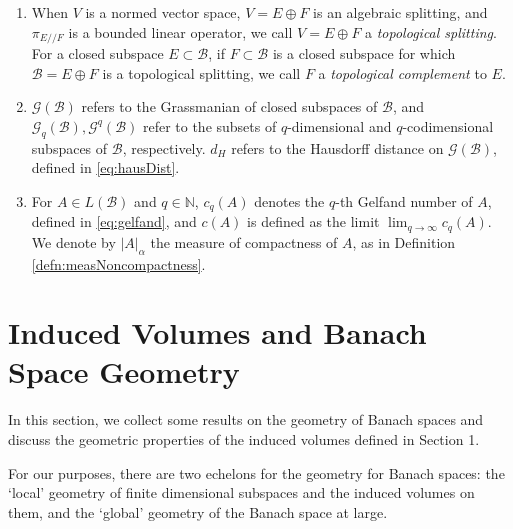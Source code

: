\documentclass[11pt]{amsart}
\theoremstyle{theorem}
\theoremstyle{definition}
\numberwithin{equation}{section}
\newcommand{\N}{\mathbb{N}}
\newcommand{\Gc}{\mathcal{G}}
\renewcommand{\a}{\alpha}
\newcommand{\Bc}{\mathcal{B}}
\newcommand{\ds}{/ \! /}
\begin{document}
\begin{enumerate}
\item When $V$ is a normed vector space, $V = E \oplus F$ is an algebraic splitting, and $\pi_{E \ds F}$ is a bounded linear operator, we call $V = E \oplus F$ a \emph{topological splitting}. For a closed subspace $E \subset \Bc$, if $F \subset \Bc$ is a closed subspace for which $\Bc = E \oplus F$ is a topological splitting, we call $F$ a \emph{topological complement} to $E$.

\item $\Gc(\Bc)$ refers to the Grassmanian of closed subspaces of $\Bc$, and $\Gc_q(\Bc), \Gc^q(\Bc)$ refer to the subsets of $q$-dimensional and $q$-codimensional subspaces of $\Bc$, respectively. $d_H$ refers to the Hausdorff distance on $\Gc(\Bc)$, defined in \eqref{eq:hausDist}.

\item For $A \in L(\Bc)$ and $q \in \N$, $c_q(A)$ denotes the $q$-th Gelfand number of $A$, defined in \eqref{eq:gelfand}, and $c(A)$ is defined as the limit $\lim_{q \to \infty} c_q(A)$. We denote by $|A|_{\a}$ the measure of compactness of $A$, as in Definition \ref{defn:measNoncompactness}.


\end{enumerate}


\section{Induced Volumes and Banach Space Geometry}

In this section, we collect some results on the geometry of Banach spaces and discuss the geometric properties of the induced volumes defined in Section 1.

For our purposes, there are two echelons for the geometry for Banach spaces: the `local' geometry of finite dimensional subspaces and the induced volumes on them, and the `global' geometry of the Banach space at large.
 
\end{document}
